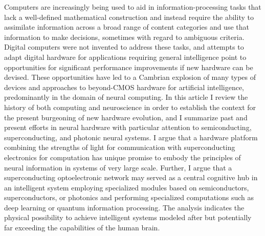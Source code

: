 Computers are increasingly being used to aid in information-processing tasks that lack a well-defined mathematical construction and instead require the ability to assimilate information across a broad range of content categories and use that information to make decisions, sometimes with regard to ambiguous criteria. Digital computers were not invented to address these tasks, and attempts to adapt digital hardware for applications requiring general intelligence point to opportunities for significant performance improvements if new hardware can be devised. These opportunities have led to a Cambrian explosion of many types of devices and approaches to beyond-CMOS hardware for artificial intelligence, predominantly in the domain of neural computing. In this article I review the history of both computing and neuroscience in order to establish the context for the present burgeoning of new hardware evolution, and I summarize past and present efforts in neural hardware with particular attention to semiconducting, superconducting, and photonic neural systems. I argue that a hardware platform combining the strengths of light for communication with superconducting electronics for computation has unique promise to embody the principles of neural information in systems of very large scale. Further, I argue that a superconducting optoelectronic network may served as a central cognitive hub in an intelligent system employing specialized modules based on semiconductors, superconductors, or photonics and performing specialized computations such as deep learning or quantum information processing. The analysis indicates the physical possibility to achieve intelligent systems modeled after but potentially far exceeding the capabilities of the human brain.